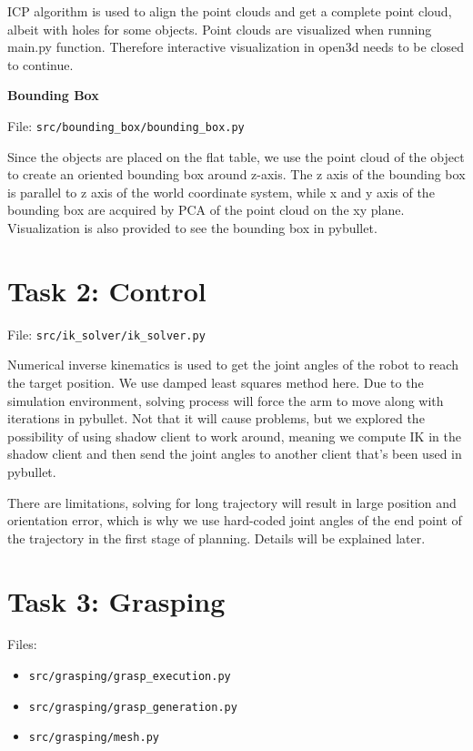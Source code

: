 \documentclass[
	english,
	accentcolor=11d,%
	type=intern,
	marginpar=false,
    logofile=media/PEARLTUDA.png
	]{tudapub}
\let\code\texttt
\begin{document}
ICP algorithm is used to align the point clouds and get a complete point cloud, albeit with holes for some objects. Point clouds are visualized when running main.py function. Therefore interactive visualization in open3d needs to be closed to continue.

\vspace{0.5cm}
\noindent\textbf{Bounding Box}

\noindent File: \code{src/bounding\_box/bounding\_box.py}

Since the objects are placed on the flat table, we use the point cloud of the object to create an oriented bounding box around z-axis. The z axis of the bounding box is parallel to z axis of the world coordinate system, while x and y axis of the bounding box are acquired by PCA of the point cloud on the xy plane. Visualization is also provided to see the bounding box in pybullet.

\section{Task 2: Control}
\noindent File: \code{src/ik\_solver/ik\_solver.py}

Numerical inverse kinematics is used to get the joint angles of the robot to reach the target position. We use damped least squares method here. Due to the simulation environment, solving process will force the arm to move along with iterations in pybullet. Not that it will cause problems, but we explored the possibility of using shadow client to work around, meaning we compute IK in the shadow client and then send the joint angles to another client that's been used in pybullet.

There are limitations, solving for long trajectory will result in large position and orientation error, which is why we use hard-coded joint angles of the end point of the trajectory in the first stage of planning. Details will be explained later.

\section{Task 3: Grasping}
Files: 
\begin{itemize}
\item \code{src/grasping/grasp\_execution.py}
\item \code{src/grasping/grasp\_generation.py}
\item \code{src/grasping/mesh.py}
\end{itemize}
\end{document}
